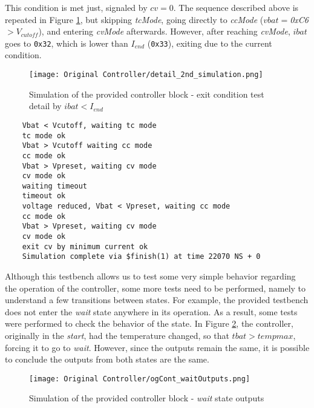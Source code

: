\documentclass[12pt]{article}
\begin{document}
This condition is met just, signaled by $cv=0$. The sequence described above is repeated in Figure \ref{fig:orig_ctr_curr_exit}, but skipping \textit{tcMode}, going directly to \textit{ccMode} ($vbat=$\textit{0xC6}$>V_{cutoff}$), and entering \textit{cvMode} afterwards. However, after reaching \textit{cvMode}, $ibat$ goes to \texttt{0x32}, which is lower than $I_{end}$ (\texttt{0x33}), exiting due to the current condition.

\begin{figure}[H]
    \centering 
    \texttt{[image: Original Controller/detail\_2nd\_simulation.png]}
    \caption{Simulation of the provided controller block - exit condition test detail by $ibat<I_{end}$}
    \label{fig:orig_ctr_curr_exit}
\end{figure}

\begin{tcolorbox}[title=Simulation Output from the original controller and testbench, colback=gray!5, colframe=black]
\small
\begin{verbatim}
    Vbat < Vcutoff, waiting tc mode
    tc mode ok
    Vbat > Vcutoff waiting cc mode
    cc mode ok
    Vbat > Vpreset, waiting cv mode
    cv mode ok
    waiting timeout
    timeout ok
    voltage reduced, Vbat < Vpreset, waiting cc mode
    cc mode ok
    Vbat > Vpreset, waiting cv mode
    cv mode ok
    exit cv by minimum current ok
    Simulation complete via $finish(1) at time 22070 NS + 0

\end{verbatim}
\end{tcolorbox}

Although this testbench allows us to test some very simple behavior regarding the operation of the controller, some more tests need to be performed, namely to understand a few transitions between states. For example, the provided testbench does not enter the \textit{wait} state anywhere in its operation. As a result, some tests were performed to check the behavior of the state. In Figure \ref{fig:orig_ctr_waitOut}, the controller, originally in the \textit{start}, had the temperature changed, so that $tbat>tempmax$, forcing it to go to \textit{wait}. However, since the outputs remain the same, it is possible to conclude the outputs from both states are the same. 

\begin{figure}[H]
    \centering 
    \texttt{[image: Original Controller/ogCont\_waitOutputs.png]}
    \caption{Simulation of the provided controller block - \textit{wait} state outputs}
    \label{fig:orig_ctr_waitOut}
\end{figure}
\end{document}
